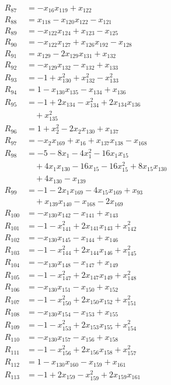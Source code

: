 \begin{align*}
R_{87}&=-x_{16}x_{119}+x_{122}\\
R_{88}&=x_{118}-x_{120}x_{122}-x_{121}\\
R_{89}&=-x_{122}x_{124}+x_{123}-x_{125}\\
R_{90}&=-x_{122}x_{127}+x_{126}x_{192}-x_{128}\\
R_{91}&=x_{129}-2x_{129}x_{131}+x_{132}\\
R_{92}&=-x_{129}x_{132}-x_{132}+x_{133}\\
R_{93}&=-1+x_{130}^{2}+x_{132}^{2}-x_{133}^{2}\\
R_{94}&=1-x_{130}x_{135}-x_{134}+x_{136}\\
R_{95}&=-1+2x_{134}-x_{134}^{2}+2x_{134}x_{136}\\
&\quad{}+x_{135}^{2}\\
R_{96}&=1+x_{2}^{2}-2x_{2}x_{130}+x_{137}\\
R_{97}&=-x_{2}x_{169}+x_{16}+x_{137}x_{138}-x_{168}\\
R_{98}&=-5-8x_{1}-4x_{1}^{2}-16x_{1}x_{15}\\
&\quad{}+4x_{1}x_{130}-16x_{15}-16x_{15}^{2}+8x_{15}x_{130}\\
&\quad{}+4x_{130}-x_{139}\\
R_{99}&=-1-2x_{1}x_{169}-4x_{15}x_{169}+x_{93}\\
&\quad{}+x_{139}x_{140}-x_{168}-2x_{169}\\
R_{100}&=-x_{130}x_{142}-x_{141}+x_{143}\\
R_{101}&=-1-x_{141}^{2}+2x_{141}x_{143}+x_{142}^{2}\\
R_{102}&=-x_{130}x_{145}-x_{144}+x_{146}\\
R_{103}&=-1-x_{144}^{2}+2x_{144}x_{146}+x_{145}^{2}\\
R_{104}&=-x_{130}x_{148}-x_{147}+x_{149}\\
R_{105}&=-1-x_{147}^{2}+2x_{147}x_{149}+x_{148}^{2}\\
R_{106}&=-x_{130}x_{151}-x_{150}+x_{152}\\
R_{107}&=-1-x_{150}^{2}+2x_{150}x_{152}+x_{151}^{2}\\
R_{108}&=-x_{130}x_{154}-x_{153}+x_{155}\\
R_{109}&=-1-x_{153}^{2}+2x_{153}x_{155}+x_{154}^{2}\\
R_{110}&=-x_{130}x_{157}-x_{156}+x_{158}\\
R_{111}&=-1-x_{156}^{2}+2x_{156}x_{158}+x_{157}^{2}\\
R_{112}&=1-x_{130}x_{160}-x_{159}+x_{161}\\
R_{113}&=-1+2x_{159}-x_{159}^{2}+2x_{159}x_{161}\\

\end{align*}
